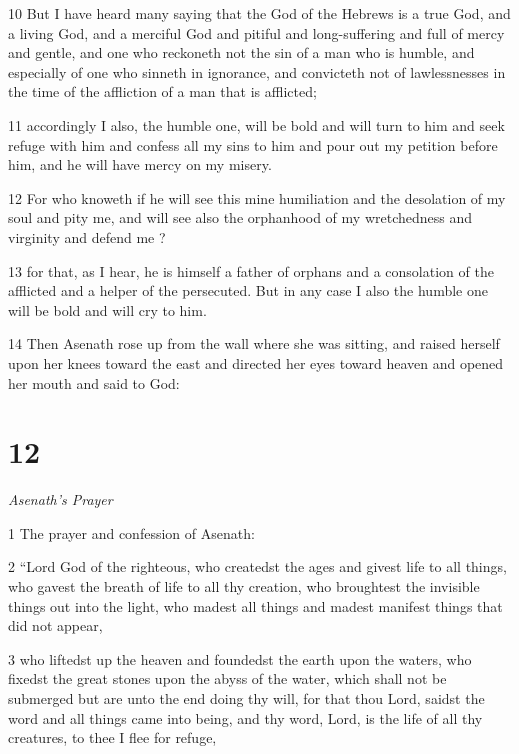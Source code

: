 \par 10 But I have heard many saying that the God of the Hebrews is a true God, and a living God, and a merciful God and pitiful and long-suffering and full of mercy and gentle, and one who reckoneth not the sin of a man who is humble, and especially of one who sinneth in ignorance, and convicteth not of lawlessnesses in the time of the affliction of a man that is afflicted; 

\par 11 accordingly I also, the humble one, will be bold and will turn to him and seek refuge with him and confess all my sins to him and pour out my petition before him, and he will have mercy on my misery. 

\par 12 For who knoweth if he will see this mine humiliation and the desolation of my soul and pity me, and will see also the orphanhood of my wretchedness and virginity and defend me ? 

\par 13 for that, as I hear, he is himself a father of orphans and a consolation of the afflicted and a helper of the persecuted. But in any case I also the humble one will be bold and will cry to him. 

\par 14 Then Asenath rose up from the wall where she was sitting, and raised herself upon her knees toward the east and directed her eyes toward heaven and opened her mouth and said to God: 

\chapter{12}

\par \textit{Asenath's Prayer}

\par 1 The prayer and confession of Asenath: 

\par 2 “Lord God of the righteous, who createdst the ages and givest life to all things, 
who gavest the breath of life to all thy creation, 
who broughtest the invisible things out into the light, 
who madest all things and madest manifest things that did not appear, 

\par 3 who liftedst up the heaven and foundedst the earth upon the waters, 
who fixedst the great stones upon the abyss of the water, 
which shall not be submerged but are unto the end doing thy will, 
for that thou Lord, saidst the word and all things came into being, and thy word, Lord, is the life of all thy creatures, to thee I flee for refuge, 

